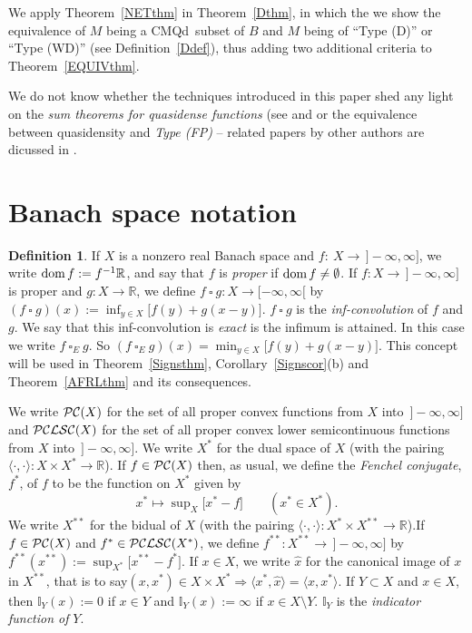 \documentclass[letterpaper]{article}
\theoremstyle{plain}
\theoremstyle{definition}
\newtheorem{definition}[theorem]{Definition}
\numberwithin{equation}{section}
\newcommand{\bra}[2]{\langle#1,#2\rangle}
\newcommand{\Bra}[2]{\big\langle#1,#2\big\rangle}
\newcommand{\cmqd}{{CMQd}}
\newcommand{\dbs}{^{**}}
\newcommand{\dom}{\hbox{\rm dom}}
\newcommand{\I}{\mathbb I}
\newcommand{\infn}{\inf\nolimits}
\newcommand{\lr}{\Longrightarrow}
\newcommand{\minn}{\min\nolimits}
\newcommand{\PC}{{\cal PC}}
\newcommand{\PCLSC}{{\cal PCLSC}}
\newcommand{\rbar}{\,]{-}\infty,\infty]}
\newcommand{\RR}{\mathbb R}
\newcommand{\squaree}{\ \square_E\ }
\newcommand{\ssquare}{\ \square\ }
\newcommand{\supn}{\sup\nolimits}
\newcommand{\wh}{\widehat}
\newcommand{\Cor}{Corollary~\ref}
\newcommand{\Def}{Definition~\ref}
\newcommand{\Sec}{Section~\ref}
\newcommand{\Thm}{Theorem~\ref}
\begin{document}
We apply \Thm{NETthm} in \Thm{Dthm}, in which the we show the equivalence of $M$ being a \cmqd\ subset of $B$ and $M$ being of ``Type (D)'' or ``Type (WD)'' (see \Def{Ddef}), thus adding two additional criteria to \Thm{EQUIVthm}.


We do not know whether the techniques introduced in this paper shed any light on the {\em sum theorems for quasidense functions} (see \cite[Theorem 8.4, pp.\ 1036--7]{PARTONE} and \cite[Theorem 8.8, p\ 1039]{PARTONE} or the equivalence between quasidensity and {\em Type (FP)} \cite[Theorem 10.3, p.\ 21]{PARTTWO} -- related papers by other authors are dicussed in \cite[Remark 10.4, pp.\ 21--22]{PARTTWO}.    
\section{Banach space notation}\label{SNsec}
\begin{definition}\label{PCdef} 
If $X$ is a nonzero real Banach space and $f\colon\ X \to \rbar$, we write $\dom\,f := f^{-1}\RR$, and say that $f$ is {\em proper} if $\dom\,f \ne \emptyset$. If $f\colon X \to \rbar$ is proper and $g\colon X \to \RR$, we define $f\ssquare g\colon X \to [-\infty,\infty[$ by $(f\ssquare g)(x) := \infn_{y \in X}\big[f(y) + g(x - y)\big]$.  $f\ssquare g$ is the {\em inf-convolution} of $f$ and $g$.      We say that this inf-convolution is {\em exact} is the infimum is attained.    In this case we write $f\squaree g$.   So $(f\squaree g)(x) = \minn_{y \in X}\big[f(y) + g(x - y)\big]$.   This concept will be used in \Thm{Signsthm}, \Cor{Signscor}(b) and \Thm{AFRLthm} and its consequences.

We write $\PC(X)$ for the set of all proper convex functions from $X$ into $\rbar$ and $\PCLSC(X)$ for the set of all proper convex lower semicontinuous functions from $X$ into $\rbar$.   We write $X^*$ for the dual space of $X$ \big(with the pairing $\bra\cdot\cdot\colon X \times X^* \to \RR$\big).  If $f \in \PC(X)$ then, as usual, we define the {\em Fenchel conjugate}, $f^*$, of $f$ to be the function on $X^*$ given by
\begin{equation}\label{FSTAR}
x^* \mapsto \supn_X\big[x^* - f\big]\qquad(x^* \in X^*).
\end{equation}
%
We write $X\dbs$ for the bidual of $X$ \big(with the pairing $\bra\cdot\cdot\colon X^* \times X\dbs \to \RR$\big).\break   If $f \in \PC(X)$ and $f^* \in \PCLSC(X^*)$, we define $f\dbs\colon X\dbs \to \rbar$ by $f\dbs(x\dbs) := \sup_{X^*}\big[x\dbs - f^*\big]$.   If $x \in X$, we write $\wh x$ for the canonical image of $x$ in $X\dbs$, that is to say\quad $(x,x^*) \in X \times X^* \lr \Bra{x^*}{\wh x} = \bra{x}{x^*}$.   If $Y \subset X$ and $x \in X$, then $\I_{Y}(x) := 0$ if $x \in Y$ and $\I_{Y}(x) := \infty$ if $x \in X \setminus Y$. $\I_Y$ is the {\em indicator function of} $Y$.
\end{definition}
\end{document}
